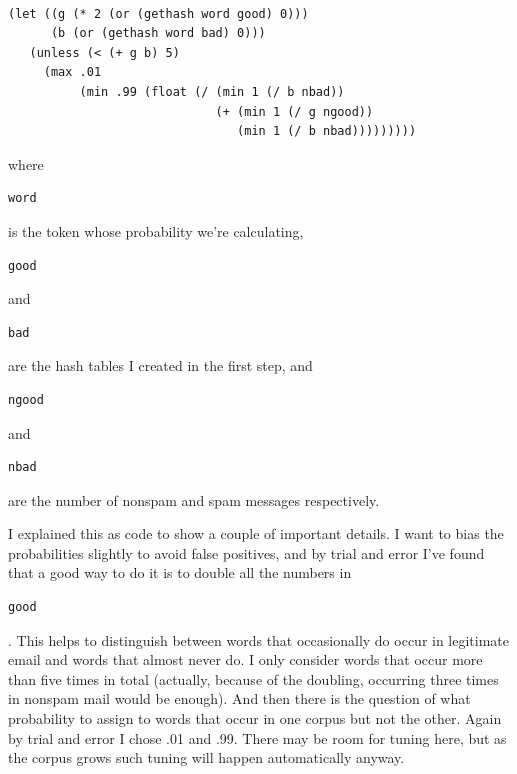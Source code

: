 \begin{verbatim}

(let ((g (* 2 (or (gethash word good) 0)))
      (b (or (gethash word bad) 0)))
   (unless (< (+ g b) 5)
     (max .01
          (min .99 (float (/ (min 1 (/ b nbad))
                             (+ (min 1 (/ g ngood))
                                (min 1 (/ b nbad)))))))))
\end{verbatim}

where

\begin{verbatim}
word
\end{verbatim}

is the token whose probability we're calculating,

\begin{verbatim}
good
\end{verbatim}

and

\begin{verbatim}
bad
\end{verbatim}

are the hash tables I created in the first step, and

\begin{verbatim}
ngood
\end{verbatim}

and

\begin{verbatim}
nbad
\end{verbatim}

are the number of nonspam and spam messages respectively.

I explained this as code to show a couple of important details. I want
to bias the probabilities slightly to avoid false positives, and by
trial and error I've found that a good way to do it is to double all the
numbers in

\begin{verbatim}
good
\end{verbatim}

. This helps to distinguish between words that occasionally do occur in
legitimate email and words that almost never do. I only consider words
that occur more than five times in total (actually, because of the
doubling, occurring three times in nonspam mail would be enough). And
then there is the question of what probability to assign to words that
occur in one corpus but not the other. Again by trial and error I chose
.01 and .99. There may be room for tuning here, but as the corpus grows
such tuning will happen automatically anyway.

